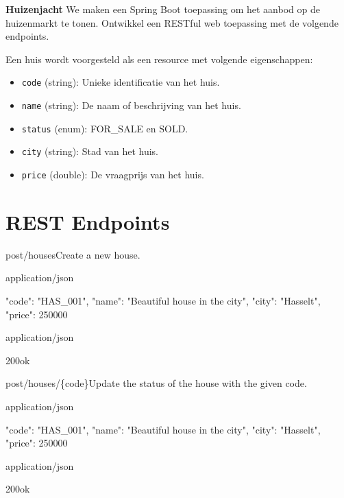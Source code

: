 \begin{oefening}\textbf{Huizenjacht}
We maken een Spring Boot toepassing om het aanbod op de huizenmarkt te tonen.
Ontwikkel een RESTful web toepassing met de volgende endpoints.

Een huis wordt voorgesteld als een resource met volgende eigenschappen:

\begin{itemize}
  \item \texttt{code} (string): Unieke identificatie van het huis.
  \item \texttt{name} (string): De naam of beschrijving van het huis.
  \item \texttt{status} (enum): FOR\_SALE en SOLD.
  \item \texttt{city} (string): Stad van het huis.
  \item \texttt{price} (double): De vraagprijs van het huis.
\end{itemize}

\section{REST Endpoints}

\begin{apiRoute}{post}{/houses}{Create a new house.}
\begin{routeParameter}
\end{routeParameter}
\begin{routeRequest}{application/json}
\begin{routeRequestBody}
{
  "code": "HAS_001",
  "name": "Beautiful house in the city",
  "city": "Hasselt",
  "price": 250000
}
\end{routeRequestBody}
\end{routeRequest}
\begin{routeResponse}{application/json}
\begin{routeResponseItem}{200}{ok}
\end{routeResponseItem}
\end{routeResponse}
\end{apiRoute}


\begin{apiRoute}{post}{/houses/\{code\}}{Update the status of the house with the given code.}
\begin{routeParameter}
\end{routeParameter}
\begin{routeRequest}{application/json}
\begin{routeRequestBody}
{
  "code": "HAS_001",
  "name": "Beautiful house in the city",
  "city": "Hasselt",
  "price": 250000
}
\end{routeRequestBody}
\end{routeRequest}
\begin{routeResponse}{application/json}
\begin{routeResponseItem}{200}{ok}
\end{routeResponseItem}
\end{routeResponse}
\end{apiRoute}


\end{oefening}
